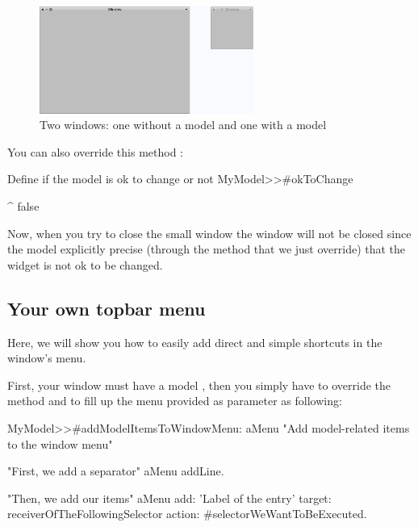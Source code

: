 \documentclass[a4paper,10pt,twoside]{book}
\begin{document}
\begin{figure}[ht]
\begin{center}
	\includegraphics[width=7cm]{WithAndWithoutModel}
	\caption{Two windows: one without a model and one with a model}
\end{center}
\end{figure}
You can also override this method :

\begin{method}{Define if the model is ok to change or not}
MyModel>>#okToChange

	^ false
\end{method}

Now, when you try to close the small window the window will not be closed since the model explicitly precise (through the method  that we just override) that the widget is not ok to be changed.

\subsection{Your own topbar menu}

Here, we will show you how to easily add direct and simple shortcuts in the window's menu.

First, your window must have a model , then you simply have to override the method  and to fill up the menu provided as parameter as following:

\begin{method}{}
MyModel>>#addModelItemsToWindowMenu: aMenu
	"Add model-related items to the window menu"
	
	"First, we add a separator"
	aMenu addLine.
	
	"Then, we add our items"
	aMenu
		add: 'Label of the entry'
		target: receiverOfTheFollowingSelector
		action: #selectorWeWantToBeExecuted.

\end{method} 
\end{document}
